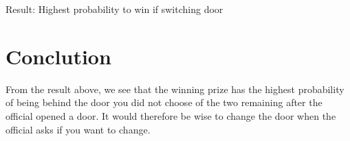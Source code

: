 \documentclass{article}
\begin{document}
Result: Highest probability to win if switching door

\newpage

\section*{Conclution}

From the result above, we see that the winning prize has the highest probability of being behind the door you did not choose of the two remaining after the official opened a door. It would therefore be wise to change the door when the official asks if you want to change.
\end{document}

